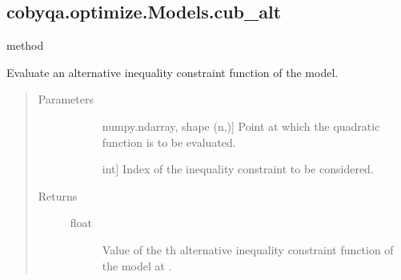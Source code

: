 \documentclass[letterpaper,10pt,english]{sphinxmanual}
\begin{document}
\begin{fulllineitems}
\begin{fulllineitems}
\begin{quote}
\begin{description}
\begin{description}
\end{description}

\end{description}\end{quote}

\end{fulllineitems}



\subsection{cobyqa.optimize.Models.cub\_alt}
\label{\detokenize{refs/generated/cobyqa.optimize.Models.cub_alt:cobyqa-optimize-models-cub-alt}}\label{\detokenize{refs/generated/cobyqa.optimize.Models.cub_alt::doc}}
\sphinxAtStartPar
method

\begin{fulllineitems}
\label{\detokenize{refs/generated/cobyqa.optimize.Models.cub_alt:cobyqa.optimize.Models.cub_alt}}
\sphinxAtStartPar
Evaluate an alternative inequality constraint function of the model.
\begin{quote}\begin{description}
\item[{Parameters}] \leavevmode\begin{description}
\item[{}] \leavevmode{[}numpy.ndarray, shape (n,){]}
\sphinxAtStartPar
Point at which the quadratic function is to be evaluated.

\item[{}] \leavevmode{[}int{]}
\sphinxAtStartPar
Index of the inequality constraint to be considered.

\end{description}

\item[{Returns}] \leavevmode\begin{description}
\item[{float}] \leavevmode
\sphinxAtStartPar
Value of the \sphinxhyphen{}th alternative inequality constraint function of
the model at .

\end{description}


\end{description}
\end{quote}
\end{fulllineitems}
\end{fulllineitems}
\end{document}
